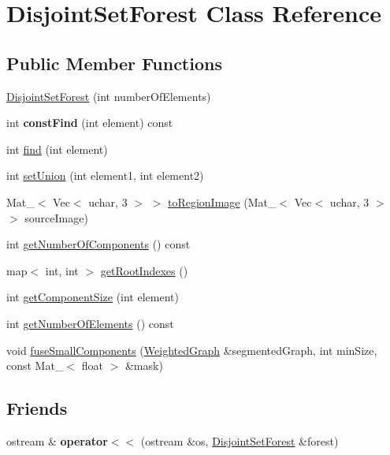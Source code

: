 \hypertarget{class_disjoint_set_forest}{\section{Disjoint\-Set\-Forest Class Reference}
\label{class_disjoint_set_forest}
}
\subsection*{Public Member Functions}
\begin{DoxyCompactItemize}
\item 
\hyperlink{class_disjoint_set_forest_ad0509685d5dee856bbedd3063bd15514}{Disjoint\-Set\-Forest} (int number\-Of\-Elements)
\item 
\hypertarget{class_disjoint_set_forest_aae340c72a05faf1815fe5dad71312652}{int {\bfseries const\-Find} (int element) const }\label{class_disjoint_set_forest_aae340c72a05faf1815fe5dad71312652}

\item 
int \hyperlink{class_disjoint_set_forest_ab2343dd6ea1c02409e5bef492bf0d515}{find} (int element)
\item 
int \hyperlink{class_disjoint_set_forest_a8910794cfdf7a6d014e9d9d0faab222c}{set\-Union} (int element1, int element2)
\item 
Mat\-\_\-$<$ Vec$<$ uchar, 3 $>$ $>$ \hyperlink{class_disjoint_set_forest_aad6c80f354f5cb0e1e5a81cee5acaed5}{to\-Region\-Image} (Mat\-\_\-$<$ Vec$<$ uchar, 3 $>$ $>$ source\-Image)
\item 
int \hyperlink{class_disjoint_set_forest_a6eb268df6da7cb4f003307e6b2acd08a}{get\-Number\-Of\-Components} () const 
\item 
map$<$ int, int $>$ \hyperlink{class_disjoint_set_forest_a6a1edb88b34acf06cf214c97ff4ad473}{get\-Root\-Indexes} ()
\item 
int \hyperlink{class_disjoint_set_forest_a1cff99abb287144053618e07479dee46}{get\-Component\-Size} (int element)
\item 
int \hyperlink{class_disjoint_set_forest_a51cf48349bef49781534a34ffd5d0104}{get\-Number\-Of\-Elements} () const 
\item 
void \hyperlink{class_disjoint_set_forest_abe1eace127491da301ae1e20d16a1041}{fuse\-Small\-Components} (\hyperlink{class_weighted_graph}{Weighted\-Graph} \&segmented\-Graph, int min\-Size, const Mat\-\_\-$<$ float $>$ \&mask)
\end{DoxyCompactItemize}
\subsection*{Friends}
\begin{DoxyCompactItemize}
\item 
\hypertarget{class_disjoint_set_forest_a7a875cd9297c14a059917aab662f102f}{ostream \& {\bfseries operator$<$$<$} (ostream \&os, \hyperlink{class_disjoint_set_forest}{Disjoint\-Set\-Forest} \&forest)}\label{class_disjoint_set_forest_a7a875cd9297c14a059917aab662f102f}

\end{DoxyCompactItemize}


